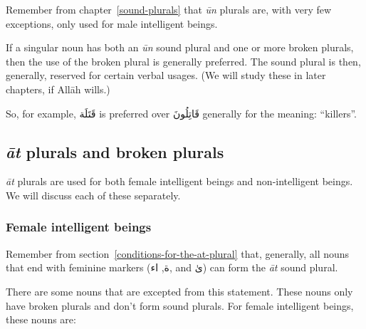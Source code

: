 \documentclass[
  10pt,
]{book}
\begin{document}
Remember from chapter~\ref{sound-plurals} that \emph{ūn} plurals are, with very few exceptions, only used for male intelligent beings.

If a singular noun has both an \emph{ūn} sound plural and one or more broken plurals, then the use of the broken plural is generally preferred. The sound plural is then, generally, reserved for certain verbal usages. (We will study these in later chapters, if Allāh wills.)

So, for example, \foreignlanguage{arabic}{قَتَلَة} is preferred over \foreignlanguage{arabic}{قَاتِلُونَ} generally for the meaning: \enquote{killers}.

\subsection{\texorpdfstring{\emph{āt} plurals and broken plurals}{āt plurals and broken plurals}}\label{at-plurals-and-broken-plurals}

\emph{āt} plurals are used for both female intelligent beings and non-intelligent beings. We will discuss each of these separately.

\subsubsection{Female intelligent beings}\label{female-intelligent-beings}

Remember from section~\ref{conditions-for-the-at-plural} that, generally, all nouns that end with feminine markers
(\foreignlanguage{arabic}{ة}, \foreignlanguage{arabic}{اء}, and \foreignlanguage{arabic}{ىٰ})
can form the \emph{āt} sound plural.

There are some nouns that are excepted from this statement. These nouns only have broken plurals and don't form sound plurals. For female intelligent beings, these nouns are:
\end{document}
